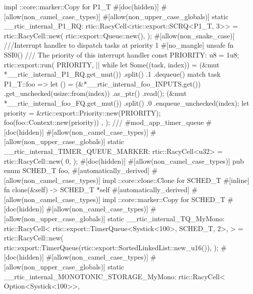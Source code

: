 {    impl ::core::marker::Copy for P1_T {}
    #[doc(hidden)]
    #[allow(non_camel_case_types)]
    #[allow(non_upper_case_globals)]
    static __rtic_internal_P1_RQ: rtic::RacyCell<rtic::export::SCRQ<P1_T, 3>> = rtic::RacyCell::new(
        rtic::export::Queue::new(),
    );
    #[allow(non_snake_case)]
    ///Interrupt handler to dispatch tasks at priority 1
    #[no_mangle]
    unsafe fn SSI0() {
        /// The priority of this interrupt handler
        const PRIORITY: u8 = 1u8;
        rtic::export::run(
            PRIORITY,
            || {
                while let Some((task, index)) = (&mut *__rtic_internal_P1_RQ.get_mut())
                    .split()
                    .1
                    .dequeue()
                {
                    match task {
                        P1_T::foo => {
                            let () = (&*__rtic_internal_foo_INPUTS.get())
                                .get_unchecked(usize::from(index))
                                .as_ptr()
                                .read();
                            (&mut *__rtic_internal_foo_FQ.get_mut())
                                .split()
                                .0
                                .enqueue_unchecked(index);
                            let priority = &rtic::export::Priority::new(PRIORITY);
                            foo(foo::Context::new(priority))
                        }
                    }
                }
            },
        );
    }
    /// #mod_app_timer_queue
    #[doc(hidden)]
    #[allow(non_camel_case_types)]
    #[allow(non_upper_case_globals)]
    static __rtic_internal_TIMER_QUEUE_MARKER: rtic::RacyCell<u32> = rtic::RacyCell::new(
        0,
    );
    #[doc(hidden)]
    #[allow(non_camel_case_types)]
    pub enum SCHED_T {
        foo,
    }
    #[automatically_derived]
    #[allow(non_camel_case_types)]
    impl ::core::clone::Clone for SCHED_T {
        #[inline]
        fn clone(&self) -> SCHED_T {
            *self
        }
    }
    #[automatically_derived]
    #[allow(non_camel_case_types)]
    impl ::core::marker::Copy for SCHED_T {}
    #[doc(hidden)]
    #[allow(non_camel_case_types)]
    #[allow(non_upper_case_globals)]
    static __rtic_internal_TQ_MyMono: rtic::RacyCell<
        rtic::export::TimerQueue<Systick<100>, SCHED_T, 2>,
    > = rtic::RacyCell::new(
        rtic::export::TimerQueue(rtic::export::SortedLinkedList::new_u16()),
    );
    #[doc(hidden)]
    #[allow(non_camel_case_types)]
    #[allow(non_upper_case_globals)]
    static __rtic_internal_MONOTONIC_STORAGE_MyMono: rtic::RacyCell<
        Option<Systick<100>>,
}
